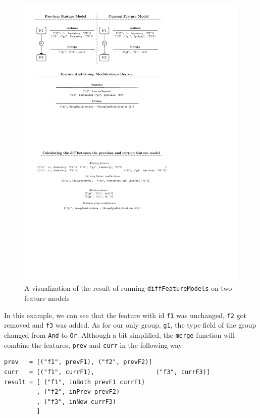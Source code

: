 \documentclass[a4paper,english]{ifimaster}
\begin{document}
\begin{figure}[htpb]
  \centering
  \includegraphics[]{feature_model_diff_visualized.pdf}
  \caption{A visualization of the result of running \texttt{diffFeatureModels} on two feature models}%
  \label{fig:diff_feature_models_visualized}
\end{figure}

In this example, we can see that the feature with id \texttt{f1} was unchanged, \texttt{f2} got removed and \texttt{f3} was added. As for our only group, \texttt{g1}, the type field of the group changed from \texttt{And} to \texttt{Or}. Although a bit simplified, the \texttt{merge} function will combine the features, \texttt{prev} and \texttt{curr} in the following way:

\begin{verbatim}
prev   = [("f1", prevF1), ("f2", prevF2)]
curr   = [("f1", currF1),                 ("f3", currF3)]
result = [ ("f1", inBoth prevF1 currF1)
         , ("f2", inPrev prevF2)
         , ("f3", inNew currF3)
         ]
\end{verbatim}
\end{document}
